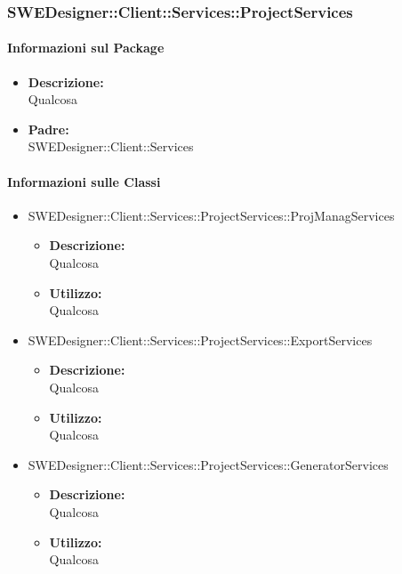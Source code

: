 		
		\subsubsection{SWEDesigner::Client::Services::ProjectServices}
		\paragraph{Informazioni sul Package}
		\begin{itemize}				
			\item \textbf{Descrizione: }\\
			Qualcosa
			\item \textbf{Padre: }\\ SWEDesigner::Client::Services
		\end{itemize}
		
		\paragraph{Informazioni sulle Classi}
		\begin{itemize}
			\item SWEDesigner::Client::Services::ProjectServices::ProjManagServices
			\begin{itemize}
				\item \textbf{Descrizione: }\\
				Qualcosa
				\item \textbf{Utilizzo: }\\
				Qualcosa
			\end{itemize}
			\item SWEDesigner::Client::Services::ProjectServices::ExportServices
			\begin{itemize}
				\item \textbf{Descrizione: }\\
				Qualcosa
				\item \textbf{Utilizzo: }\\
				Qualcosa
			\end{itemize}
			\item SWEDesigner::Client::Services::ProjectServices::GeneratorServices
			\begin{itemize}
				\item \textbf{Descrizione: }\\
				Qualcosa
				\item \textbf{Utilizzo: }\\
				Qualcosa
			\end{itemize}
		\end{itemize}
	